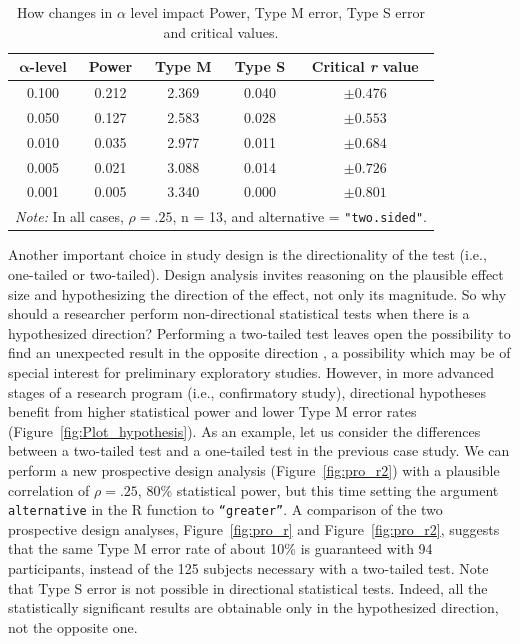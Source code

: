 \documentclass{article}\usepackage[]{graphicx}\usepackage[]{color}
\newenvironment{knitrout}{}{} %
\begin{document}
\begin{knitrout}
\color{fgcolor}\begin{table}[H]

\caption{\label{tab:Table_alpha}How changes in $\alpha$ level impact Power, Type M error, Type S error and critical values.}
\centering
\begin{tabular}[t]{ccccc}
\toprule
\multicolumn{1}{c}{\textbf{$\bm{\alpha}$-level}} & \multicolumn{1}{c}{\textbf{Power}} & \multicolumn{1}{c}{\textbf{Type M}} & \multicolumn{1}{c}{\textbf{Type S}} & \multicolumn{1}{c}{\textbf{Critical \textit{r} value}}\\
\midrule
0.100 & 0.212 & 2.369 & 0.040 & $\pm0.476$\\
0.050 & 0.127 & 2.583 & 0.028 & $\pm0.553$\\
0.010 & 0.035 & 2.977 & 0.011 & $\pm0.684$\\
0.005 & 0.021 & 3.088 & 0.014 & $\pm0.726$\\
0.001 & 0.005 & 3.340 & 0.000 & $\pm0.801$\\
\bottomrule
\multicolumn{5}{l}{\textit{Note: } In all cases, $\rho=.25$, n = 13, and alternative  = \texttt{"two.sided"}.}\\
\end{tabular}
\end{table}


\end{knitrout}

Another important choice in study design is the directionality of the test (i.e., one-tailed or two-tailed).  Design analysis invites reasoning on the plausible effect size and hypothesizing the direction of the effect, not only its magnitude. So why should a researcher perform non-directional statistical tests when there is a hypothesized direction? Performing a two-tailed test leaves open the possibility to find an unexpected result in the opposite direction \parencite{cohenStatisticalPowerAnalysis1988}, a possibility which may be of special interest for preliminary exploratory studies. However, in more advanced stages of a research program (i.e., confirmatory study), directional hypotheses benefit from higher statistical power and lower Type M error rates (Figure~\ref{fig:Plot_hypothesis}). As an example, let us consider the differences between a two-tailed test and a one-tailed test in the previous case study. We can perform a new prospective design analysis (Figure~\ref{fig:pro_r2}) with a plausible correlation of $\rho=.25$, 80\% statistical power, but this time setting the argument \texttt{alternative} in the R function to \texttt{“greater”}. A comparison of the two prospective design analyses, Figure~\ref{fig:pro_r} and Figure~\ref{fig:pro_r2}, suggests that the same Type M error rate of about 10\% is guaranteed with 94 participants, instead of the 125 subjects necessary with a two-tailed test. Note that Type S error is not possible in directional statistical tests. Indeed, all the statistically significant results are obtainable only in the hypothesized direction, not the opposite one.
\end{document}
